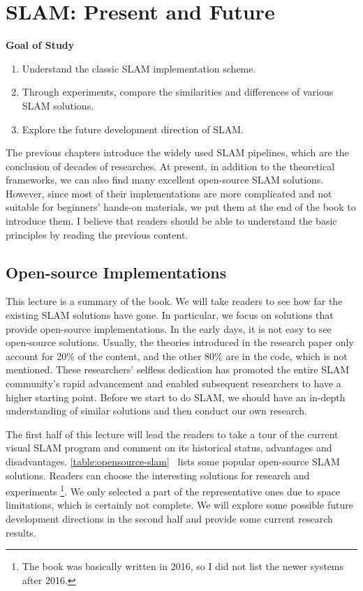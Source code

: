 \chapter{SLAM: Present and Future}
\label{cpt:14}
\begin{mdframed}  
	\textbf{Goal of Study}
	\begin{enumerate}[labelindent=0em,leftmargin=1.5em]
		\item Understand the classic SLAM implementation scheme.
		\item Through experiments, compare the similarities and differences of various SLAM solutions.
		\item Explore the future development direction of SLAM.
	\end{enumerate}
\end{mdframed}

The previous chapters introduce the widely used SLAM pipelines, which are the conclusion of decades of researches. At present, in addition to the theoretical frameworks, we can also find many excellent open-source SLAM solutions. However, since most of their implementations are more complicated and not suitable for beginners' hands-on materials, we put them at the end of the book to introduce them. I believe that readers should be able to understand the basic principles by reading the previous content.

\newpage
\section{Open-source Implementations}
This lecture is a summary of the book. We will take readers to see how far the existing SLAM solutions have gone. In particular, we focus on solutions that provide open-source implementations. In the early days, it is not easy to see open-source solutions. Usually, the theories introduced in the research paper only account for 20\% of the content, and the other 80\% are in the code, which is not mentioned. These researchers' selfless dedication has promoted the entire SLAM community's rapid advancement and enabled subsequent researchers to have a higher starting point. Before we start to do SLAM, we should have an in-depth understanding of similar solutions and then conduct our own research.

The first half of this lecture will lead the readers to take a tour of the current visual SLAM program and comment on its historical status, advantages and disadvantages. \autoref{table:opensource-slam}~ lists some popular open-source SLAM solutions. Readers can choose the interesting solutions for research and experiments \footnote{The book was basically written in 2016, so I did not list the newer systems after 2016.}. We only selected a part of the representative ones due to space limitations, which is certainly not complete. We will explore some possible future development directions in the second half and provide some current research results.

